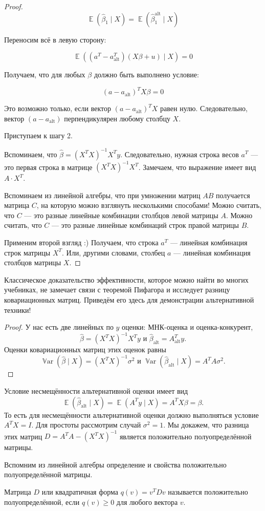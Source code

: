 \documentclass[12pt]{article}
\DeclareMathOperator{\Var}{\mathbb{V}ar}
\DeclareMathOperator{\E}{\mathbb{E}}
\newcommand{\hb}{\hat{\beta}}
\newcommand{\alt}{\text{alt}}
\begin{document}
\begin{proof}
\[
\E(\hb_1 \mid X) = \E(\hb_1^{\alt} \mid X)
\]

Переносим всё в левую сторону:

\[
\E((a^T - a^T_{\alt})(X\beta + u) \mid X) = 0
\]

Получаем, что для любых $\beta$ должно быть выполнено условие:

\[
(a - a_{\alt})^T X\beta = 0
\]

Это возможно только, если вектор $(a - a_{\alt})^T X$ равен нулю. 
Следовательно, вектор $(a - a_{\alt})$ перпендикулярен любому столбцу $X$.


Приступаем к шагу 2.

Вспоминаем, что $\hat \beta = (X^T X)^{-1}X^T y$. Следовательно, нужная строка весов $a^T$ — 
это первая строка в матрице $(X^TX)^{-1}X^T$. 
Замечаем, что выражение имеет вид $A \cdot X^T$. 

Вспоминаем из линейной алгебры, что при умножении матриц $AB$ получается матрица $C$, 
на которую можно взглянуть несколькими способами!
Можно считать, что $C$ — это разные линейные комбинации столбцов левой матрицы $A$. 
Можно считать, что $C$ — это разные линейные комбинаций строк правой матрицы $B$.

Применим второй взгляд :) Получаем, что строка $a^T$ — линейная комбинация строк матрицы $X^T$. 
Или, другими словами, столбец $a$ — линейная комбинация столбцов матрицы $X$.
\end{proof}

Классическое доказательство эффективности, которое можно найти во многих учебниках, не замечает связи с теоремой Пифагора и исследует разницу ковариационных матриц. 
Приведём его здесь для демонстрации альтернативной техники!
\begin{proof}
У нас есть две линейных по $y$ оценки: МНК-оценка и оценка-конкурент,
\[
\hb = (X^TX)^{-1}X^T y \text{ и } \hb_{\alt} = A^T_{\alt} y.
\]
Оценки ковариационных матриц этих оценок равны 
\[
\Var(\hb \mid X) = (X^TX)^{-1} \sigma^2 \text{ и } \Var(\hb_{\alt} \mid X) = A^TA \sigma^2.
\]
\end{proof}
Условие несмещённости альтернативной оценки имеет вид 
\[
\E(\hb_{\alt} \mid X) = \E(A^T y \mid X) = A^T X\beta = \beta.
\]
То есть для несмещённости альтернативной оценки должно выполняться условие $A^T X = I$.
Для простоты рассмотрим случай $\sigma^2 = 1$.
Мы докажем, что разница этих матриц $D = A^TA - (X^TX)^{-1}$ является положительно полуопределённой матрицы. 

Вспомним из линейной алгебры определение и свойства положительно полуопределённой матрицы.
\begin{definition}
Матрица $D$ или квадратичная форма $q(v) = v^T D v$ называется положительно полуопределённой, если $q(v) \geq 0$ для любого вектора $v$.
\end{definition}
\end{document}
